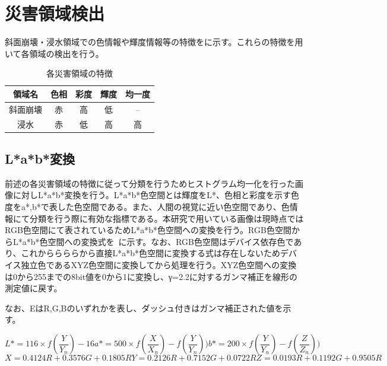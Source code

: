 \documentclass[../Thesis]{subfiles}
\begin{document}
\section{災害領域検出}
  斜面崩壊・浸水領域での色情報や輝度情報等の特徴をに示す。これらの特徴を用いて各領域の検出を行う。
  
	\begin{table}[b]
		\centering
		\caption{各災害領域の特徴}
		\label{tab01}
		\begin{tabular}{c c c c c}
			\hline
			領域名 & 色相 & 彩度 & 輝度 & 均一度 \\
			\hline
			\hline
			斜面崩壊 & 赤 & 高 & 低 & -- \\
			浸水 & 赤 & 低 & 高 & 高 \\ \hline
		\end{tabular}
	\end{table}

\subsection{L*a*b*変換}
  前述の各災害領域の特徴に従って分類を行うためヒストグラム均一化を行った画像に対しL*a*b*変換を行う。L*a*b*色空間とは輝度をL*、色相と彩度を示す色度をa*,b*で表した色空間である。また、人間の視覚に近い色空間であり、色情報にて分類を行う際に有効な指標である。本研究で用いている画像は現時点ではRGB色空間にて表されているためL*a*b*色空間への変換を行う。RGB色空間からL*a*b*色空間への変換式を{}~{}に示す。なお、RGB色空間はデバイス依存色であり、これかららららから直接L*a*b*色空間に変換する式は存在しないためデバイス独立色であるXYZ色空間に変換してから処理を行う。XYZ色空間への変換は0から255までの8bit値を0から1に変換し、γ=2.2に対するガンマ補正を線形の測定値に戻す。
  
  なお、EはR,G,Bのいずれかを表し、ダッシュ付きはガンマ補正された値を示す。
  
  \begin{equation}
    L* = 116 \times f(\frac{Y}{Y_n}) - 16
    a* = 500 \times f(\frac{X}{X_n}) - f(\frac{Y}{Y_n}))
    b* = 200 \times f(\frac{Y}{Y_n}) - f(\frac{Z}{Z_n}))
  \end{equation}
  \begin{equation}
    X = 0.4124R+0.3576G+0.1805R
    Y = 0.2126R+0.7152G+0.0722R
    Z = 0.0193R+0.1192G+0.9505R
  \end{equation}
\end{document}
